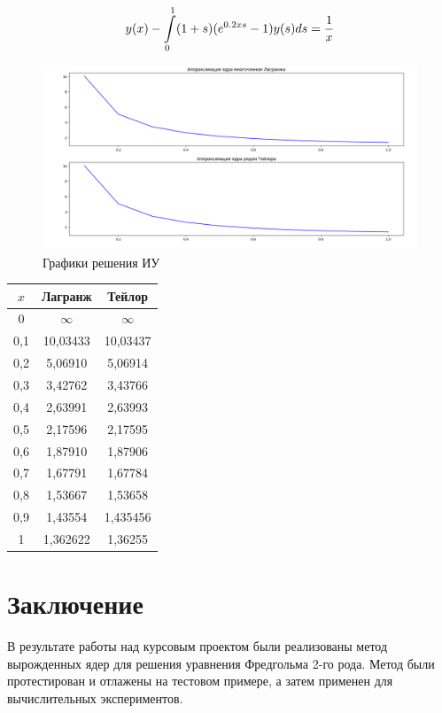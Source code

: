 \documentclass[14pt, a4paper]{extarticle}
\begin{document}
	\[ y(x) - \int\displaylimits_{0}^{1} (1+s)(e^{0.2xs}-1)y(s)ds = \dfrac{1}{x} \]
	\begin{figure}[h]
		\centering
		\includegraphics[width = \linewidth]{plot_4.png}
		\caption{Графики решения ИУ}
	\end{figure}
	\begin{center}
		\begin{tabular}{ |c|c|c| }
			\hline
			$x$ & Лагранж & Тейлор\\
			\hline
			0 & $\infty$ & $\infty$\\
			\hline
			0,1 & 10,03433 & 10,03437\\
			\hline
			0,2 & 5,06910 & 5,06914\\
			\hline
			0,3 & 3,42762 & 3,43766\\
			\hline
			0,4 & 2,63991 & 2,63993\\
			\hline
			0,5 & 2,17596 & 2,17595\\
			\hline
			0,6 & 1,87910 & 1,87906\\
			\hline
			0,7 & 1,67791 & 1,67784\\
			\hline
			0,8 & 1,53667 & 1,53658\\
			\hline
			0,9 & 1,43554 & 1,435456\\
			\hline
			1 & 1,362622 & 1,36255\\
			\hline
		\end{tabular}
	\end{center}
		
	\section{Заключение}
	
	В результате работы над курсовым проектом были реализованы метод вырожденных ядер для решения уравнения Фредгольма 2-го рода. Метод были протестирован и отлажены на тестовом примере, а затем применен для вычислительных экспериментов.
	
\end{document}
